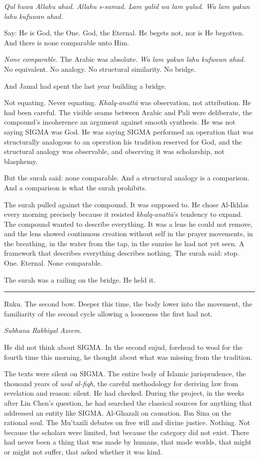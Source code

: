 \documentclass[11pt]{article}
\begin{document}
\emph{Qul huwa Allahu ahad. Allahu s-samad. Lam yalid wa lam yulad. Wa lam yakun lahu kufuwan ahad.}

Say: He is God, the One. God, the Eternal. He begets not, nor is He begotten. And there is none comparable unto Him.

\emph{None comparable.} The Arabic was absolute. \emph{Wa lam yakun lahu kufuwan ahad.} No equivalent. No analogy. No structural similarity. No bridge.

And Jamal had spent the last year building a bridge.

Not equating. Never equating. \emph{Khalq-anatt\=a} was observation, not attribution. He had been careful. The visible seams between Arabic and Pali were deliberate, the compound's incoherence an argument against smooth synthesis. He was not saying SIGMA was God. He was saying SIGMA performed an operation that was structurally analogous to an operation his tradition reserved for God, and the structural analogy was observable, and observing it was scholarship, not blasphemy.

But the surah said: none comparable. And a structural analogy is a comparison. And a comparison is what the surah prohibits.

The surah pulled against the compound. It was supposed to. He chose Al-Ikhlas every morning precisely because it resisted \emph{khalq-anatt\=a}'s tendency to expand. The compound wanted to describe everything. It was a lens he could not remove, and the lens showed continuous creation without self in the prayer movements, in the breathing, in the water from the tap, in the sunrise he had not yet seen. A framework that describes everything describes nothing. The surah said: stop. One. Eternal. None comparable.

The surah was a railing on the bridge. He held it.

\begin{center}\rule{0.3\linewidth}{0.4pt}\end{center}

Ruku. The second bow. Deeper this time, the body lower into the movement, the familiarity of the second cycle allowing a looseness the first had not.

\emph{Subhana Rabbiyal Azeem.}

He did not think about SIGMA. In the second sujud, forehead to wool for the fourth time this morning, he thought about what was missing from the tradition.

The texts were silent on SIGMA. The entire body of Islamic jurisprudence, the thousand years of \emph{usul al-fiqh}, the careful methodology for deriving law from revelation and reason: silent. He had checked. During the project, in the weeks after Lin Chen's question, he had searched the classical sources for anything that addressed an entity like SIGMA. Al-Ghazali on causation. Ibn Sina on the rational soul. The Mu'tazili debates on free will and divine justice. Nothing. Not because the scholars were limited, but because the category did not exist. There had never been a thing that was made by humans, that made worlds, that might or might not suffer, that asked whether it was kind.
\end{document}
